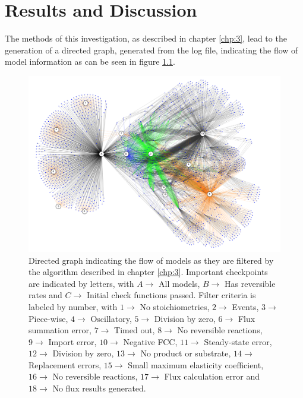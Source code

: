 \chapter{Results and Discussion} \label{chp:4}

The methods of this investigation, as described in chapter \ref{chp:3}, lead to the generation of a directed graph, generated from the log file, indicating the flow of model information as can be seen in figure \ref{Graph_modDistro}. 

\begin{figure}[p] \label{Graph_modDistro}
\includegraphics[width=1\textwidth]{figs/Digraph.png}
\centering
\caption{Directed graph indicating the flow of models as they are filtered by the algorithm described in chapter \ref{chp:3}. 
Important checkpoints are indicated by letters, with $A \rightarrow{}$ All models, $B \rightarrow{}$ Has reversible rates and $C \rightarrow{}$ Initial check functions passed. Filter criteria is labeled by number, with $1 \rightarrow{}$ No stoichiometries, $2 \rightarrow{}$ Events, $3 \rightarrow{}$ Piece-wise, $4 \rightarrow{}$ Oscillatory, $5 \rightarrow{}$ Division by zero, $6 \rightarrow{}$ Flux summation error, $7 \rightarrow{}$ Timed out, $8 \rightarrow{}$ No reversible reactions, $9 \rightarrow{}$ Import error, $10 \rightarrow{}$ Negative FCC, $11 \rightarrow{}$ Steady-state error, $12 \rightarrow{}$ Division by zero, $13 \rightarrow{}$ No product or substrate, $14 \rightarrow{}$ Replacement errors, $15 \rightarrow{}$ Small maximum elasticity coefficient, $16 \rightarrow{}$ No reversible reactions, $17 \rightarrow{}$ Flux calculation error and $18 \rightarrow{}$ No flux results generated.}
\end{figure}

